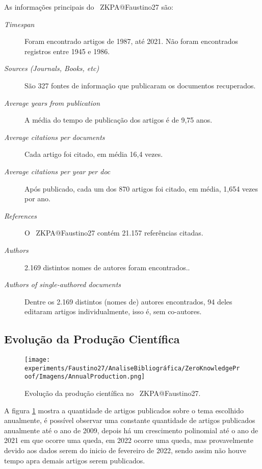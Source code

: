 As informações principais do \dataset\ ZKPA@Faustino27 são:
\begin{description}
    \item [\textit{Timespan}] Foram encontrado artigos de 1987, até 2021. Não foram encontrados registros entre 1945 e 1986.
    \item [\textit{Sources (Journals, Books, etc)}] São 327 fontes de informação que publicaram os documentos recuperados.
    \item [\textit{Average years from publication}] A média do tempo de publicação dos artigos é de 9,75 anos.
    \item [\textit{Average citations per documents}] Cada artigo foi citado, em média 16,4 vezes.
    \item [\textit{Average citations per year per doc}] Após publicado, cada um dos 870 artigos foi citado, em média, 1,654 vezes por ano.
    \item [\textit{References}] O \dataset\ ZKPA@Faustino27 contém 21.157 referências citadas.
    \item [\textit{Authors}] 2.169 distintos nomes de autores foram encontrados..
    \item [\textit{Authors of single-authored documents}] Dentre os 2.169 distintos (nomes de) autores encontrados, 94 deles editaram artigos individualmente, isso é, sem co-autores.
\end{description}

\subsection{Evolução da Produção Científica}

\begin{figure}
    \centering
    \texttt{[image: experiments/Faustino27/AnaliseBibliográfica/ZeroKnowledgeProof/Imagens/AnnualProduction.png]}
    \caption{Evolução da produção científica no \dataset\   ZKPA@Faustino27.}
    \label{fig:evol:anual:ZKPA@Faustino27}
\end{figure}

A figura \ref{fig:evol:anual:ZKPA@Faustino27} mostra a quantidade de artigos publicados sobre o tema escolhido anualmente, é possível observar uma constante quantidade de artigos publicados anualmente até o ano de 2009, depois há um crescimento polinomial até o ano de 2021 em que ocorre uma queda, em 2022 ocorre uma queda, mas provavelmente devido aos dados serem do inicio de fevereiro de 2022, sendo assim não houve tempo apra demais artigos serem publicados. 